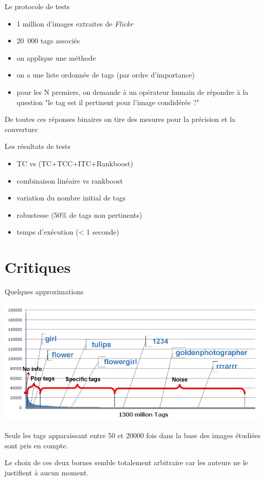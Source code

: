 \documentclass{beamer}
\begin{document}
\begin{frame}{Le protocole de tests}
	
	\begin{itemize}
	\item 1 million d'images extraites de \emph{Flickr}
	\item 20~000 tags associés
	\item on applique une méthode
	\item on a une liste ordonnée de tags (par ordre d'importance)
	\item pour les N premiers, on demande à un opérateur humain de répondre à la question "le tag est il pertinent pour l'image condidérée ?"
	\end{itemize}
	
	De toutes ces réponses binaires on tire des mesures pour la précision et la couverture

\end{frame}

\begin{frame}{Les résultats de tests}
	
	\begin{itemize}
	\item TC vs (TC+TCC+ITC+Rankboost)
	\item combinaison linéaire vs rankboost
	\item variation du nombre initial de tags
	\item robustesse (50\% de tags non pertinents)
	\item temps d'exécution (< 1 seconde)
	\end{itemize}

\end{frame}


\section{Critiques}

\begin{frame}{Quelques approximations}
	
	\begin{center}
        \includegraphics[width=.80\linewidth]{images/fig1.png}
	\end{center}
    Seuls les tags apparaissant entre 50 et 20000 fois dans la base des images étudiées sont pris en compte.

    Le choix de ces deux bornes semble totalement arbitraire car les auteurs ne le justifient à aucun moment.

\end{frame}
\end{document}
